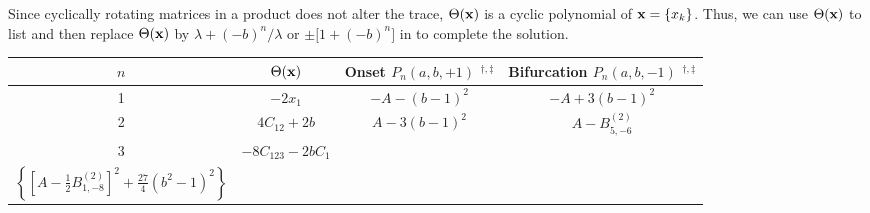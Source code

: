 \documentclass{ws-ijbc}
\begin{document}
Since cyclically rotating matrices in a product does not alter the trace,
$\Theta(\mathbf{x})$ is a cyclic polynomial of $\mathbf{x} = \{ x_k \}$.
%
Thus, we can use $\Theta(\mathbf{x})$ to list 
and then replace $\Theta(\mathbf{x})$ by $\lambda + (-b)^n/\lambda$
or $\pm\big[ 1 + (-b)^n \big]$
in  to complete the solution.



\newcommand{\BB}[2]{B^{(2)}_{#1,#2}}
\newcommand{\BBB}[3]{B^{(4)}_{#1,#2,#3}}
\newcommand{\BBBB}[4]{B^{(6)}_{#1,#2,#3,#4}}

\begin{table}[h]\footnotesize
{\begin{tabular*}{\linewidth}{c c c c}
\hline
$n$
& $\Theta(\mathbf{x})$
& Onset $P_n(a, b, +1)$ $^{\dagger, \ddagger}$
& Bifurcation $P_n(a, b, -1)$ $^{\dagger, \ddagger}$ \\
\hline
1
& $-2 x_1$
& $-A - (b-1)^2$
& $-A + 3(b-1)^2$ \\
2
& $4 C_{12} + 2 b$
& $A-3 (b-1)^2$
& $A - \BB{5}{-6}$ \\
3
&
  $-8C_{123}-2b C_1$
&
  \begin{minipage}[h]{.35\linewidth}
  $\left( -A + \BB{7}{10} \right)$ \\
  $\left\{ \left[ A -\frac{1}{2}\BB{1}{-8} \right]^2 + \frac{27}{4} (b^2-1)^2 \right\}$
  \end{minipage}


\end{tabular*}}
\end{table}
\end{document}
